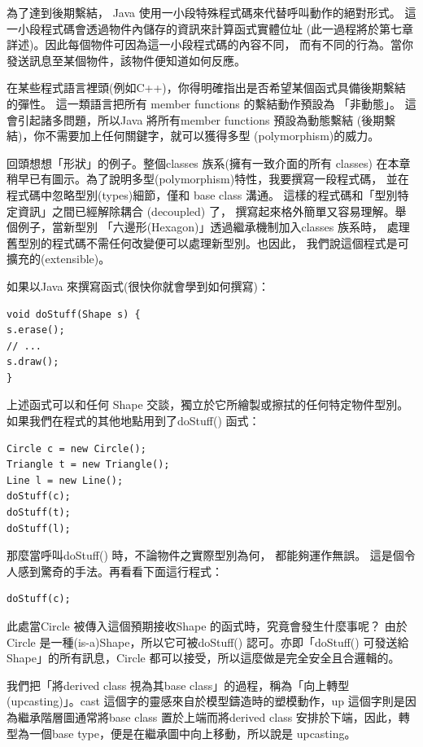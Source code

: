 為了達到後期繫結， Java
使用一小段特殊程式碼來代替呼叫動作的絕對形式。
這一小段程式碼會透過物件內儲存的資訊來計算函式實體位址
(此一過程將於第七章詳述)。因此每個物件可因為這一小段程式碼的內容不同，
而有不同的行為。當你發送訊息至某個物件，該物件便知道如何反應。

在某些程式語言裡頭(例如C++)，你得明確指出是否希望某個函式具備後期繫結的彈性。
這一類語言把所有 member functions 的繫結動作預設為 「非動態」。
這會引起諸多問題，所以Java 將所有member functions 預設為動態繫結
(後期繫結)，你不需要加上任何關鍵字，就可以獲得多型 (polymorphism)的威力。

回頭想想「形狀」的例子。整個classes 族系(擁有一致介面的所有 classes)
在本章稍早已有圖示。為了說明多型(polymorphism)特性，我要撰寫一段程式碼，
並在程式碼中忽略型別(types)細節，僅和 base class 溝通。
這樣的程式碼和「型別特定資訊」之間已經解除耦合 (decoupled) 了，
撰寫起來格外簡單又容易理解。舉個例子，當新型別
「六邊形(Hexagon)」透過繼承機制加入classes 族系時，
處理舊型別的程式碼不需任何改變便可以處理新型別。也因此，
我們說這個程式是可擴充的(extensible)。

如果以Java 來撰寫函式(很快你就會學到如何撰寫)：
\begin{verbatim}
void doStuff(Shape s) {
s.erase();
// ...
s.draw();
}
\end{verbatim}

上述函式可以和任何 Shape 交談，獨立於它所繪製或擦拭的任何特定物件型別。
如果我們在程式的其他地點用到了doStuff() 函式：
\begin{verbatim}
Circle c = new Circle();
Triangle t = new Triangle();
Line l = new Line();
doStuff(c);
doStuff(t);
doStuff(l);
\end{verbatim}

那麼當呼叫doStuff() 時，不論物件之實際型別為何，
都能夠運作無誤。 這是個令人感到驚奇的手法。再看看下面這行程式：
\begin{verbatim}
doStuff(c);
\end{verbatim}

此處當Circle 被傳入這個預期接收Shape 的函式時，究竟會發生什麼事呢？
由於Circle 是一種(is-a)Shape，所以它可被doStuff() 認可。亦即「doStuff()
可發送給Shape」的所有訊息，Circle 都可以接受，所以這麼做是完全安全且合邏輯的。

我們把「將derived class 視為其base class」的過程，稱為「向上轉型
(upcasting)」。cast 這個字的靈感來自於模型鑄造時的塑模動作，up
這個字則是因為繼承階層圖通常將base class 置於上端而將derived class
安排於下端，因此，轉型為一個base type，便是在繼承圖中向上移動，所以說是
upcasting。

